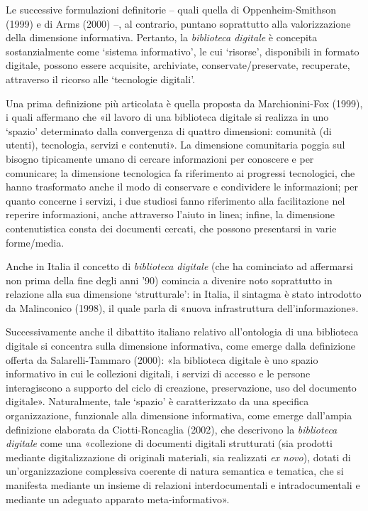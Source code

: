 Le successive formulazioni definitorie -- quali quella di
Oppenheim-Smithson (1999) e di Arms (2000) --, al contrario, puntano
soprattutto alla valorizzazione della dimensione informativa. Pertanto,
la \emph{biblioteca digitale} è concepita sostanzialmente come `sistema
informativo', le cui `risorse', disponibili in formato digitale, possono
essere acquisite, archiviate, conservate/preservate, recuperate,
attraverso il ricorso alle `tecnologie digitali'.

Una prima definizione più articolata è quella proposta da
Marchionini-Fox (1999), i quali affermano che «il lavoro di una
biblioteca digitale si realizza in uno `spazio' determinato dalla
convergenza di quattro dimensioni: comunità (di utenti), tecnologia,
servizi e contenuti». La dimensione comunitaria poggia sul bisogno
tipicamente umano di cercare informazioni per conoscere e per
comunicare; la dimensione tecnologica fa riferimento ai progressi
tecnologici, che hanno trasformato anche il modo di conservare e
condividere le informazioni; per quanto concerne i servizi, i due
studiosi fanno riferimento alla facilitazione nel reperire informazioni,
anche attraverso l'aiuto in linea; infine, la dimensione contenutistica
consta dei documenti cercati, che possono presentarsi in varie
forme/media.

Anche in Italia il concetto di \emph{biblioteca digitale} (che ha
cominciato ad affermarsi non prima della fine degli anni '90) comincia a
divenire noto soprattutto in relazione alla sua dimensione
`strutturale': in Italia, il sintagma è stato introdotto da Malinconico
(1998), il quale parla di «nuova infrastruttura dell'informazione».

Successivamente anche il dibattito italiano relativo all'ontologia di
una biblioteca digitale si concentra sulla dimensione informativa, come
emerge dalla definizione offerta da Salarelli-Tammaro (2000): «la
biblioteca digitale è uno spazio informativo in cui le collezioni
digitali, i servizi di accesso e le persone interagiscono a supporto del
ciclo di creazione, preservazione, uso del documento digitale».
Naturalmente, tale `spazio' è caratterizzato da una specifica
organizzazione, funzionale alla dimensione informativa, come emerge
dall'ampia definizione elaborata da Ciotti-Roncaglia (2002), che
descrivono la \emph{biblioteca digitale} come una «collezione di
documenti digitali strutturati (sia prodotti mediante digitalizzazione
di originali materiali, sia realizzati \emph{ex novo}), dotati di
un'organizzazione complessiva coerente di natura semantica e tematica,
che si manifesta mediante un insieme di relazioni interdocumentali e
intradocumentali e mediante un adeguato apparato meta-informativo».


